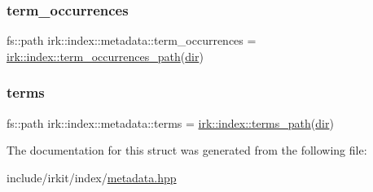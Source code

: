 \mbox{\label{structirk_1_1index_1_1metadata_a9abaf09f8e29f9be71171242db8839ec}} 
\subsubsection{\texorpdfstring{term\+\_\+occurrences}{term\_occurrences}}
{\footnotesize\ttfamily fs\+::path irk\+::index\+::metadata\+::term\+\_\+occurrences = \mbox{\hyperlink{namespaceirk_1_1index_ae4bdbf4ec595e47df214a7b1bea0a4b9}{irk\+::index\+::term\+\_\+occurrences\+\_\+path}}(\mbox{\hyperlink{structirk_1_1index_1_1metadata_a355b4325c022cd152e68fc18b1775fc6}{dir}})}

\mbox{\label{structirk_1_1index_1_1metadata_ac3c1d47e784d486a72d249cc5b7675d2}} 
\subsubsection{\texorpdfstring{terms}{terms}}
{\footnotesize\ttfamily fs\+::path irk\+::index\+::metadata\+::terms = \mbox{\hyperlink{namespaceirk_1_1index_a5453ea8070a0840ba13036ebcdf24fc1}{irk\+::index\+::terms\+\_\+path}}(\mbox{\hyperlink{structirk_1_1index_1_1metadata_a355b4325c022cd152e68fc18b1775fc6}{dir}})}



The documentation for this struct was generated from the following file\+:\begin{DoxyCompactItemize}
\item 
include/irkit/index/\mbox{\hyperlink{metadata_8hpp}{metadata.\+hpp}}\end{DoxyCompactItemize}
